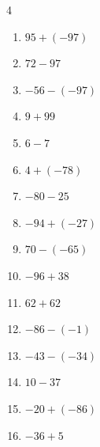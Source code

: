 \begin{multicols}{4}
\begin{enumerate}
        \phantom{$=124$}

  \item $95+(-97)$

        \phantom{$=-2$}

  \item $72-97$

        \phantom{$=-25$}

  \item $-56-(-97)$

        \phantom{$=41$}

  \item $9+99$

        \phantom{$=108$}

  \item $6-7$

        \phantom{$=-1$}

\columnbreak %

  \item $4+(-78)$

        \phantom{$=-74$}

  \item $-80-25$

        \phantom{$=-105$}

  \item $-94+(-27)$

        \phantom{$=-121$}

  \item $70-(-65)$

        \phantom{$=135$}

  \item $-96+38$

        \phantom{$=-58$}

  \item $62+62$

        \phantom{$=124$}

  \item $-86-(-1)$

        \phantom{$=-85$}

  \item $-43-(-34)$

        \phantom{$=-9$}

  \item $10-37$

        \phantom{$=-27$}

  \item $-20+(-86)$

        \phantom{$=-106$}

  \item $-36+5$


\end{enumerate}
\end{multicols}
